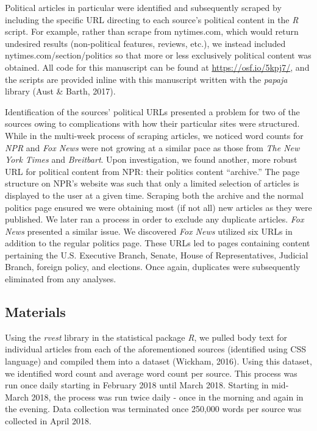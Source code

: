 \documentclass[english,,man]{apa6}
\begin{document}
Political articles in particular were identified and subsequently
scraped by including the specific URL directing to each source's
political content in the \emph{R} script. For example, rather than
scrape from nytimes.com, which would return undesired results
(non-political features, reviews, etc.), we instead included
nytimes.com/section/politics so that more or less exclusively political
content was obtained. All code for this manuscript can be found at
\url{https://osf.io/5kpj7/}, and the scripts are provided inline with
this manuscript written with the \emph{papaja} library (Aust \& Barth,
2017).

Identification of the sources' political URLs presented a problem for
two of the sources owing to complications with how their particular
sites were structured. While in the multi-week process of scraping
articles, we noticed word counts for \emph{NPR} and \emph{Fox News} were
not growing at a similar pace as those from \emph{The New York Times}
and \emph{Breitbart}. Upon investigation, we found another, more robust
URL for political content from NPR: their politics content
\enquote{archive.} The page structure on NPR's website was such that
only a limited selection of articles is displayed to the user at a given
time. Scraping both the archive and the normal politics page ensured we
were obtaining most (if not all) new articles as they were published. We
later ran a process in order to exclude any duplicate articles.
\emph{Fox News} presented a similar issue. We discovered \emph{Fox News}
utilized six URLs in addition to the regular politics page. These URLs
led to pages containing content pertaining the U.S. Executive Branch,
Senate, House of Representatives, Judicial Branch, foreign policy, and
elections. Once again, duplicates were subsequently eliminated from any
analyses.

\subsection{Materials}\label{materials}

Using the \emph{rvest} library in the statistical package \emph{R}, we
pulled body text for individual articles from each of the aforementioned
sources (identified using CSS language) and compiled them into a dataset
(Wickham, 2016). Using this dataset, we identified word count and
average word count per source. This process was run once daily starting
in February 2018 until March 2018. Starting in mid-March 2018, the
process was run twice daily - once in the morning and again in the
evening. Data collection was terminated once 250,000 words per source
was collected in April 2018.
\end{document}
